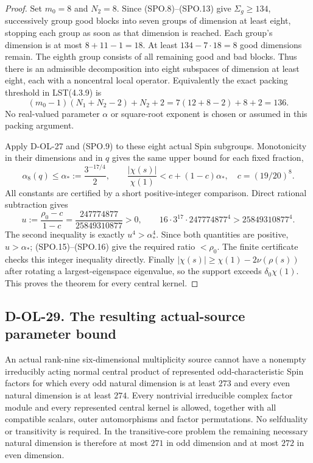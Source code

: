 \begin{proof}
Set $m_0=8$ and $N_2=8$.
Since (SPO.8)--(SPO.13) give $\Sigma_g\ge134$, successively
group good blocks into seven groups of dimension at least
eight, stopping each group as soon as that dimension is
reached.  Each group's dimension is at most
$8+11-1=18$.  At least $134-7\cdot18=8$ good dimensions
remain.  The eighth group consists of all remaining good
and bad blocks.  Thus there is an admissible decomposition
into eight subspaces of dimension at least eight, each
with a noncentral local operator.
Equivalently the exact packing threshold in LST(4.3.9) is
\[
 (m_0-1)(N_1+N_2-2)+N_2+2
                  =7(12+8-2)+8+2=136.
 \tag{SPO.14}
\]
No real-valued parameter $\alpha$ or square-root exponent
is chosen or assumed in this packing argument.

Apply D-OL-27 and (SPO.9) to these eight actual Spin
subgroups.  Monotonicity in their dimensions and in $q$
gives the same upper bound for each fixed fraction,
\[
 \alpha_8(q)\le\alpha_*:=\frac{3^{-17/4}}2,
 \qquad
 \frac{|\chi(s)|}{\chi(1)}
       <c+(1-c)\alpha_*,\quad c=(19/20)^8.
 \tag{SPO.15}
\]
All constants are certified by a short positive-integer
comparison.  Direct rational subtraction gives
\[
 u:=\frac{\rho_0-c}{1-c}
       =\frac{247774877}{25849310877}>0,
 \qquad
 16\cdot3^{17}\cdot247774877^4>25849310877^4.
 \tag{SPO.16}
\]
The second inequality is exactly $u^4>\alpha_*^4$.
Since both quantities are positive, $u>\alpha_*$;
(SPO.15)--(SPO.16) give the required ratio $<\rho_0$.
The finite certificate checks this integer inequality
directly.  Finally $|\chi(s)|\ge\chi(1)-2\nu(\rho(s))$
after rotating a largest-eigenspace eigenvalue, so the
support exceeds $\delta_0\chi(1)$.
This proves the theorem for every central kernel.
\end{proof}

\subsection*{D-OL-29. The resulting actual-source parameter bound}

\begin{theorem}[D-OL-29]
An actual rank-nine six-dimensional multiplicity source cannot
have a nonempty irreducibly acting normal central product of
represented odd-characteristic Spin factors for which every
odd natural dimension is at least $273$ and every even natural
dimension is at least $274$.
Every nontrivial irreducible complex factor module and every
represented central kernel is allowed, together with all
compatible scalars, outer automorphisms and factor permutations.
No selfduality or transitivity is required.
In the transitive-core problem the remaining necessary natural
dimension is therefore at most $271$ in odd dimension and
at most $272$ in even dimension.
\end{theorem}

